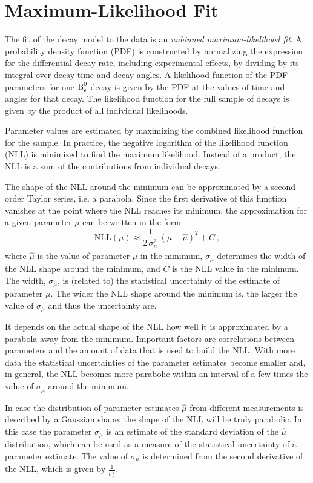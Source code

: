 \section{Maximum-Likelihood Fit}
\label{sec:ana_fit}

The fit of the decay model to the data is an \emph{unbinned maximum-likelihood fit}. A probability density function (PDF) is constructed by
normalizing the expression for the differential decay rate, including experimental effects, by dividing by its integral over decay time and
decay angles. A likelihood function of the PDF parameters for one $\text{B}_\text{s}^\text{0}$ decay is given by the PDF at the values of time and angles for
that decay. The likelihood function for the full sample of decays is given by the product of all individual likelihoods.

Parameter values are estimated by maximizing the combined likelihood function for the sample. In practice, the negative logarithm of the
likelihood function (NLL) is minimized to find the maximum likelihood. Instead of a product, the NLL is a sum of the contributions from
individual decays.

The shape of the NLL around the minimum can be approximated by a second order Taylor series, i.e. a parabola. Since the first derivative of
this function vanishes at the point where the NLL reaches its minimum, the approximation for a given parameter $\mu$ can be written in the
form
\begin{equation}
  \label{eq:NLLPara}
  \text{NLL}(\mu) \approx \frac{1}{2\,\sigma_\mu^2}\, (\mu-\hat{\mu})^2 + C \ ,
\end{equation}
where $\hat{\mu}$ is the value of parameter $\mu$ in the minimum, $\sigma_\mu$ determines the width of the NLL shape around the minimum,
and $C$ is the NLL value in the minimum. The width, $\sigma_\mu$, is (related to) the statistical uncertainty of the estimate of parameter
$\mu$. The wider the NLL shape around the minimum is, the larger the value of $\sigma_\mu$ and thus the uncertainty are.

It depends on the actual shape of the NLL how well it is approximated by a parabola away from the minimum. Important factors are
correlations between parameters and the amount of data that is used to build the NLL. With more data the statistical uncertainties of
the parameter estimates become smaller and, in general, the NLL becomes more parabolic within an interval of a few times the value of
$\sigma_\mu$ around the minimum.

In case the distribution of parameter estimates $\hat{\mu}$ from different measurements is described by a Gaussian shape, the shape of the
NLL will be truly parabolic. In this case the parameter $\sigma_\mu$ is an estimate of the standard deviation of the $\hat{\mu}$
distribution, which can be used as a measure of the statistical uncertainty of a parameter estimate. The value of $\sigma_\mu$ is
determined from the second derivative of the NLL, which is given by $\frac{1}{\sigma_\mu^2}$.

